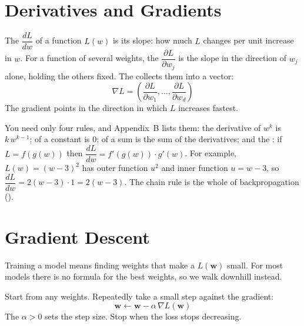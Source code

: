 \section{Derivatives and Gradients}

\begin{definitionbox}
The  $\dfrac{dL}{dw}$ of a function $L(w)$ is its slope: how much
$L$ changes per unit increase in $w$. For a function of several weights, the
 $\dfrac{\partial L}{\partial w_j}$ is the slope in the
direction of $w_j$ alone, holding the others fixed. The  collects
them into a vector:
\[
\nabla L = \left(\frac{\partial L}{\partial w_1}, \dots, \frac{\partial L}{\partial w_d}\right)
\]
The gradient points in the direction in which $L$ increases fastest.
\end{definitionbox}

You need only four rules, and Appendix~B lists them: the derivative of $w^k$ is
$k\,w^{k-1}$; of a constant is 0; of a sum is the sum of the derivatives; and the
: if $L = f(g(w))$ then $\dfrac{dL}{dw} = f'(g(w))\cdot g'(w)$.
For example, $L(w) = (w-3)^2$ has outer function $u^2$ and inner function
$u = w - 3$, so $\dfrac{dL}{dw} = 2(w-3)\cdot 1 = 2(w-3)$. The chain rule is the
whole of backpropagation ().

\section{Gradient Descent}

Training a model means finding weights that make a  $L(\mathbf{w})$
small. For most models there is no formula for the best weights, so we walk
downhill instead.

\begin{definitionbox}
Start from any weights. Repeatedly take a small step against the gradient:
\[
\mathbf{w} \leftarrow \mathbf{w} - \alpha\, \nabla L(\mathbf{w})
\]
The  $\alpha > 0$ sets the step size. Stop when the loss stops
decreasing.
\end{definitionbox}

